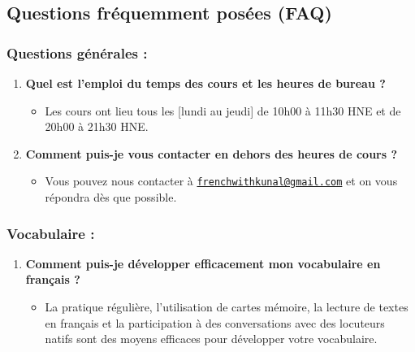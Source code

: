 \documentclass[
  16pt,
  letterpaper,
  DIV=11,
  numbers=noendperiod]{scrartcl}
\author{}
\date{}
\providecommand{\tightlist}{%
  \setlength{\itemsep}{0pt}\setlength{\parskip}{0pt}}\usepackage{longtable,booktabs,array}
\begin{document}
\subsection{Questions fréquemment posées
(FAQ)}\label{questions-fruxe9quemment-posuxe9es-faq}

\subsubsection{Questions générales :}\label{questions-guxe9nuxe9rales}

\begin{enumerate}
\def\labelenumi{\arabic{enumi}.}
\tightlist
\item
  \textbf{Quel est l'emploi du temps des cours et les heures de bureau
  ?}

  \begin{itemize}
  \tightlist
  \item
    Les cours ont lieu tous les {[}lundi au jeudi{]} de 10h00 à 11h30
    HNE et de 20h00 à 21h30 HNE.
  \end{itemize}
\item
  \textbf{Comment puis-je vous contacter en dehors des heures de cours
  ?}

  \begin{itemize}
  \tightlist
  \item
    Vous pouvez nous contacter à
    \href{mailto:frenchwithkunal@gmail.com}{\nolinkurl{frenchwithkunal@gmail.com}}
    et on vous répondra dès que possible.
  \end{itemize}
\end{enumerate}

\subsubsection{Vocabulaire :}\label{vocabulaire}

\begin{enumerate}
\def\labelenumi{\arabic{enumi}.}
\setcounter{enumi}{2}
\tightlist
\item
  \textbf{Comment puis-je développer efficacement mon vocabulaire en
  français ?}

  \begin{itemize}
  \tightlist
  \item
    La pratique régulière, l'utilisation de cartes mémoire, la lecture
    de textes en français et la participation à des conversations avec
    des locuteurs natifs sont des moyens efficaces pour développer votre
    vocabulaire.
  \end{itemize}
\end{enumerate}
\end{document}
